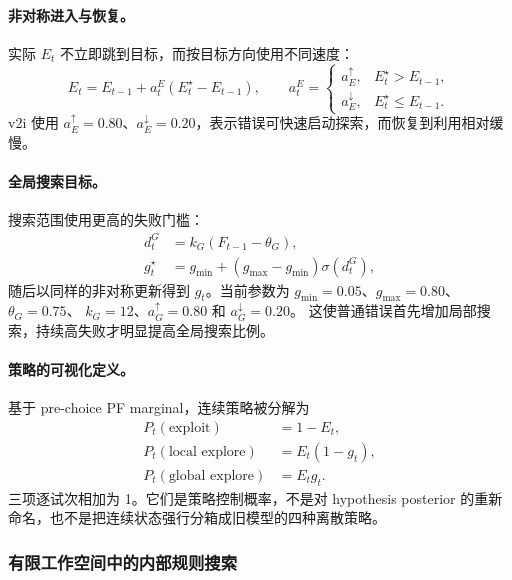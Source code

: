 \paragraph{非对称进入与恢复。}
实际 $E_t$ 不立即跳到目标，而按目标方向使用不同速度：
\begin{equation}
E_t
=E_{t-1}
+a^E_t(E_t^\star-E_{t-1}),
\qquad
a^E_t=
\begin{cases}
a_E^\uparrow,&E_t^\star>E_{t-1},\\
a_E^\downarrow,&E_t^\star\le E_{t-1}.
\end{cases}
\label{eq:model0811-exploration-smoothing}
\end{equation}
v2i 使用 $a_E^\uparrow=0.80$、$a_E^\downarrow=0.20$，表示错误可快速启动探索，而恢复到利用相对缓慢。

\paragraph{全局搜索目标。}
搜索范围使用更高的失败门槛：
\begin{align}
d^G_t
&=k_G(F_{t-1}-\theta_G),
\nonumber\\
g_t^\star
&=g_{\min}+(g_{\max}-g_{\min})\sigma(d^G_t),
\label{eq:model0811-global-target}
\end{align}
随后以同样的非对称更新得到 $g_t$。当前参数为
$g_{\min}=0.05$、$g_{\max}=0.80$、$\theta_G=0.75$、
$k_G=12$、$a_G^\uparrow=0.80$ 和 $a_G^\downarrow=0.20$。
这使普通错误首先增加局部搜索，持续高失败才明显提高全局搜索比例。

\paragraph{策略的可视化定义。}
基于 pre-choice PF marginal，连续策略被分解为
\begin{align}
P_t(\text{exploit})&=1-E_t,
\nonumber\\
P_t(\text{local explore})&=E_t(1-g_t),
\nonumber\\
P_t(\text{global explore})&=E_tg_t.
\label{eq:model0811-strategy-decomposition}
\end{align}
三项逐试次相加为 1。它们是策略控制概率，不是对 hypothesis posterior 的重新命名，也不是把连续状态强行分箱成旧模型的四种离散策略。


\subsubsection{有限工作空间中的内部规则搜索}


